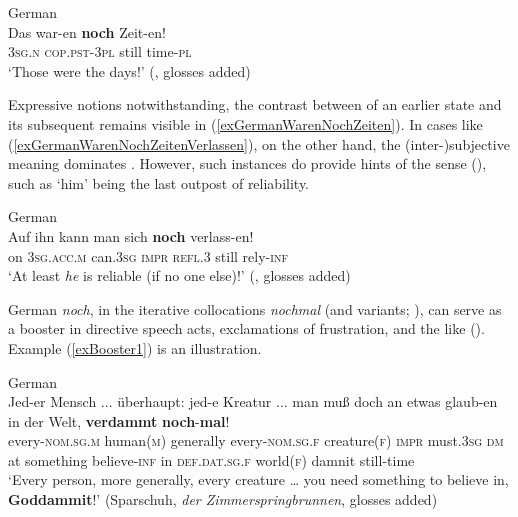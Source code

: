 \begin{exe}
	\ex German\label{exGermanWarenNochZeiten}\\
	\gll Das war-en \textbf{noch} Zeit-en!\\
	3\textsc{sg}.\textsc{n} \textsc{cop}.\textsc{pst}-3\textsc{pl} still time-\textsc{pl}\\
	\glt \lq Those were the days!\rq{ }(\cite[633]{MetrichFaucher2009}, glosses added)
\end{exe}

Expressive notions notwithstanding, the contrast between  of an earlier state and its subsequent  remains visible in (\ref{exGermanWarenNochZeiten}). In cases like (\ref{exGermanWarenNochZeitenVerlassen}), on the other hand, the (inter-)subjective meaning dominates \parencite[633]{MetrichFaucher2009}. However, such instances do provide hints of the  sense (), such as \lq him\rq{ }being the last outpost of reliability.

\begin{exe}
	\ex German\label{exGermanWarenNochZeitenVerlassen}\\
	\gll Auf ihn kann man sich \textbf{noch} verlass-en!\\
	on 3\textsc{sg}.\textsc{acc}.\textsc{m} can.3\textsc{sg} \textsc{impr} \textsc{refl}.3 still rely-\textsc{inf}\\
	\glt \lq At least \textit{he} is reliable (if no one else)!\rq{ }(\cite[633]{MetrichFaucher2009}, glosses added)
\end{exe}

German \textit{noch}, in the iterative collocations \textit{nochmal} (and variants; ), can serve as a booster in directive speech acts, exclamations of frustration, and the like (). Example (\ref{exBooster1}) is an illustration.

\begin{exe}
	\ex German\label{exBooster1}\\
	\gll Jed-er Mensch ... überhaupt: jed-e Kreatur ... man muß doch an etwas glaub-en in der Welt, \textbf{verdammt} \textbf{noch}-\textbf{mal}!\\
	every-\textsc{nom}.\textsc{sg}.\textsc{m} human(\textsc{m}) {} generally every-\textsc{nom}.\textsc{sg}.\textsc{f} creature(\textsc{f)} {} \textsc{impr} must.3\textsc{sg} \textsc{dm} at something believe-\textsc{inf} in \textsc{def}.\textsc{dat}.\textsc{sg}.\textsc{f} world(\textsc{f}) damnit still-time\\
	\glt \lq Every person, more generally, every creature … you need something to believe in, \textbf{Goddammit}!\rq{ }(Sparschuh, \textit{der Zimmerspringbrunnen}, glosses added)
\end{exe}

